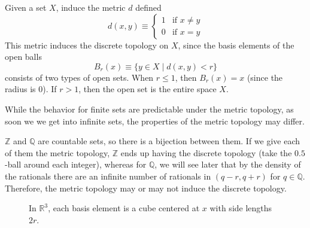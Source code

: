   \begin{example}
    Given a set $X$, induce the metric $d$ defined
    \begin{equation}
      d(x, y) \equiv \begin{cases} 1 & \text{if } x \neq y \\ 0 & \text{if } x = y \end{cases}
    \end{equation}
    This metric induces the discrete topology on $X$, since the basis elements of the open balls
    \begin{equation}
      B_r (x) \equiv \{ y \in X \mid d(x, y) <r\}
    \end{equation}
    consists of two types of open sets. When $r \leq 1$, then $B_r (x) = x$ (since the radius is $0$). If $r > 1$, then the open set is the entire space $X$. 
  \end{example} 

  While the behavior for finite sets are predictable under the metric topology, as soon we we get into infinite sets, the properties of the metric topology may differ. 

  \begin{example}
    $\mathbb{Z}$ and $\mathbb{Q}$ are countable sets, so there is a bijection between them. If we give each of them the metric topology, $\mathbb{Z}$ ends up having the discrete topology (take the $0.5$-ball around each integer), whereas for $\mathbb{Q}$, we will see later that by the density of the rationals there are an infinite number of rationals in $(q - r, q + r)$ for $q \in \mathbb{Q}$. Therefore, the metric topology may or may not induce the discrete topology. 
  \end{example}

  \begin{example}
    \begin{figure}[H]
      \centering 
      \caption{In $\mathbb{R}^3$, each basis element is a cube centered at $x$ with side lengths $2r$.} 
      \label{fig:}
    \end{figure}
  \end{example}

